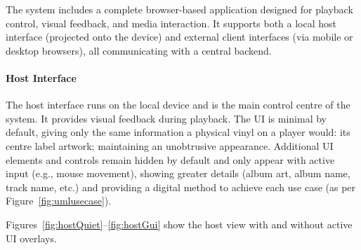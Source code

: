             The system includes a complete browser-based application designed for playback control, visual feedback, and media interaction. It supports both a local host interface (projected onto the device) and external client interfaces (via mobile or desktop browsers), all communicating with a central backend.
    
            \paragraph{Host Interface}
    
            The host interface runs on the local device and is the main control centre of the system. It provides visual feedback during playback. The UI is minimal by default, giving only the same information a physical vinyl on a player would: its centre label artwork; maintaining an unobtrusive appearance. Additional UI elements and controls remain hidden by default and only appear with active input (e.g., mouse movement), showing greater details (album art, album name, track name, etc.) and providing a digital method to achieve each use case (as per Figure~\ref{fig:umlusecase}).
    
            Figures~\ref{fig:hostQuiet}–\ref{fig:hostGui} show the host view with and without active UI overlays.
    
